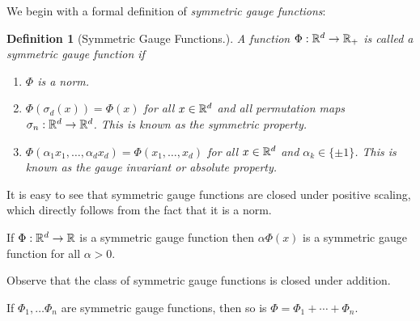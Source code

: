 \documentclass[sn-nature]{sn-jnl}%
\theoremstyle{thmstyleone}%
\newtheorem{defn}{Definition}
\theoremstyle{thmstyletwo}%
\theoremstyle{thmstylethree}%
\begin{document}

We begin with a formal definition of \emph{symmetric gauge functions}:

        \begin{defn}[Symmetric Gauge Functions.] A function $\Phi: \mathbb{R}^d \to \mathbb{R}_+$ is called a \emph{symmetric gauge function} if 
        \begin{enumerate}
            \item $\Phi$ is a norm.
        \item $\Phi(\sigma_d(x)) = \Phi(x)$ for all $x \in \mathbb{R}^d$ and all permutation maps $\sigma_n: \mathbb{R}^d \to \mathbb{R}^d$. This is known as the \emph{symmetric property}.
        \item $\Phi(\alpha_1 x_1, \ldots, \alpha_d x_d) = \Phi(x_1, \ldots, x_d)$ for all $x \in \mathbb{R}^d$ and $\alpha_k \in \{\pm 1\}$. This is known as the \emph{gauge invariant} or \emph{absolute property}.
        \end{enumerate}
    \end{defn}


It is easy to see that symmetric gauge functions are closed under positive scaling, which directly follows from the fact that it is a norm.


    \begin{prop}
        If $\Phi:\mathbb{R}^d \to \mathbb{R}$ is a symmetric gauge function then $\alpha \Phi(x)$ is a symmetric gauge function for all $\alpha > 0$.
    \end{prop}


Observe that the class of symmetric gauge functions is closed under addition. 


    \begin{prop}
        If $\Phi_1, \ldots \Phi_n$ are symmetric gauge functions, then so is $\Phi = \Phi_1 + \cdots + \Phi_n.$ 
    \end{prop}
\end{document}

